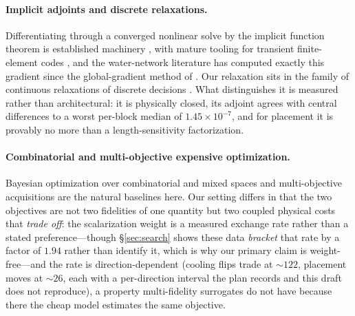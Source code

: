 \documentclass{article}
\begin{document}
\paragraph{Implicit adjoints and discrete relaxations.}
Differentiating through a converged nonlinear solve by the implicit function theorem is
established machinery \citep{amos2017optnet,bai2019deq,pineda2022theseus}, with mature
tooling for transient finite-element codes \citep{farrell2013dolfin}, and the
water-network literature has computed exactly this gradient since the global-gradient
method of \citet{todini1988}.  Our relaxation sits in the family of continuous
relaxations of discrete decisions
\citep{grover2019,cuturi2019,pogancic2020,blondel2020}.  What distinguishes it is
measured rather than architectural: it is physically closed, its adjoint agrees with
central differences to a worst per-block median of $1.45\times10^{-7}$, and for
placement it is provably no more than a length-sensitivity factorization.

\paragraph{Combinatorial and multi-objective expensive optimization.}
Bayesian optimization over combinatorial and mixed spaces
\citep{baptista2018bocs,wan2021casmopolitan} and multi-objective acquisitions
\citep{knowles2006parego,daulton2020qnehvi} are the natural baselines here.  Our setting
differs in that the two objectives are not two fidelities of one quantity but two
coupled physical costs that \emph{trade off}: the scalarization weight is a measured
exchange rate rather than a stated preference---though \S\ref{sec:search} shows these
data \emph{bracket} that rate by a factor of $1.94$ rather than identify it, which is why
our primary claim is weight-free---and the rate is direction-dependent (cooling flips
trade at ${\sim}122$, placement moves at ${\sim}26$, each with a per-direction interval
the plan records and this draft does not reproduce), a property multi-fidelity surrogates
do not have because there the cheap model estimates the same objective.
\end{document}
